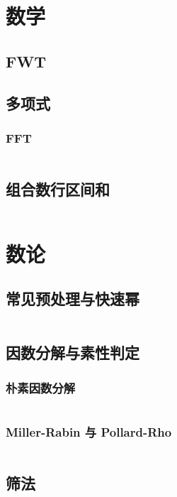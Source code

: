 \documentclass[a4paper, twoside]{article}
\begin{document}
	\begin{multicols}{2}

		\section{数学}
			\subsection{FWT}
				

			\subsection{多项式}
				\subsubsection{FFT}
					\inputminted{cpp}{../src/math/FFT.cpp}

			\subsection{组合数行区间和}
				\inputminted{cpp}{../src-midori/math/杨辉三角行区间和.cpp}

		\newpage
		\section{数论}

			\subsection{常见预处理与快速幂}
				\inputminted{cpp}{../src-midori/number/常见预处理与快速幂.cpp}

			\subsection{因数分解与素性判定}
				\subsubsection{朴素因数分解}
					\inputminted{cpp}{../src-midori/number/素因数分解.cpp}
				\subsubsection{Miller-Rabin 与 Pollard-Rho}
					\inputminted{cpp}{../src-midori/number/miller_rabin-pollard_rho.cpp}

			\subsection{筛法}

\end{multicols}
\end{document}
